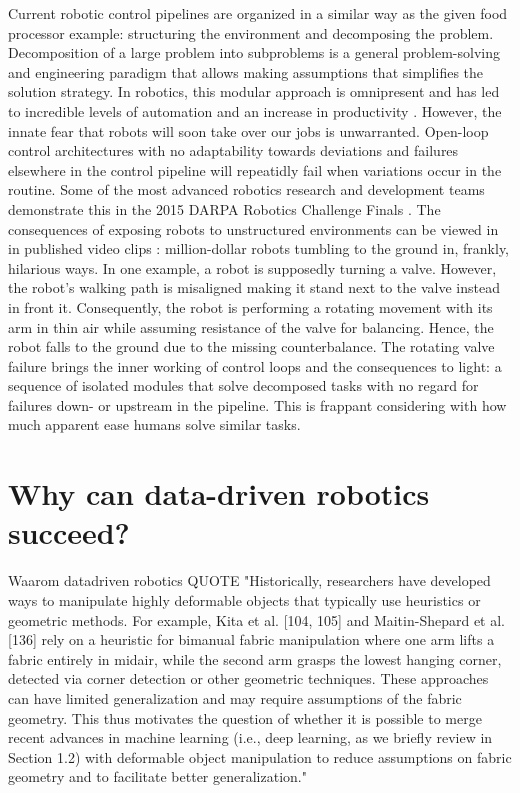 \documentclass[\home/main.tex]{subfiles}
\begin{document}
Current robotic control pipelines are organized in a similar way as the given food processor example: structuring the environment and decomposing the problem. Decomposition of a large problem into subproblems is a general problem-solving and engineering paradigm that allows making assumptions that simplifies the solution strategy. In robotics, this modular approach is omnipresent and has led to incredible levels of automation and an increase in productivity \autocite{Graetz2018}. However, the innate fear that robots will soon take over our jobs \autocite{cave2019hopes} is unwarranted. 
Open-loop control architectures with no adaptability towards deviations and failures elsewhere in the control pipeline will repeatidly fail when variations occur in the routine. Some of the most advanced robotics research and development teams demonstrate this in the 2015 DARPA Robotics Challenge Finals \autocite{DARPA2015}. The consequences of exposing robots to unstructured environments can be viewed in in published video clips \autocite{darpaVideos}: million-dollar robots tumbling to the ground in, frankly, hilarious ways. In one example, a robot is supposedly turning a valve. However, the robot's walking path is misaligned making it stand next to the valve instead in front it. Consequently, the robot is performing a rotating movement with its arm in thin air while assuming resistance of the valve for balancing. Hence, the robot falls to the ground due to the missing counterbalance. The rotating valve failure brings the inner working of control loops and the consequences to light: a sequence of isolated modules that solve decomposed tasks with no regard for failures down- or upstream in the pipeline. 
This is frappant considering with how much apparent ease humans solve similar tasks. 

\section{Why can data-driven robotics succeed?}
Waarom datadriven robotics 
QUOTE "Historically, researchers have developed ways to manipulate highly deformable objects
that typically use heuristics or geometric methods. For example, Kita et al. [104, 105]
and Maitin-Shepard et al. [136] rely on a heuristic for bimanual fabric manipulation where
one arm lifts a fabric entirely in midair, while the second arm grasps the lowest hanging
corner, detected via corner detection or other geometric techniques. These approaches can
have limited generalization and may require assumptions of the fabric geometry. This thus
motivates the question of whether it is possible to merge recent advances in machine learning
(i.e., deep learning, as we briefly review in Section 1.2) with deformable object manipulation
to reduce assumptions on fabric geometry and to facilitate better generalization."
\end{document}
